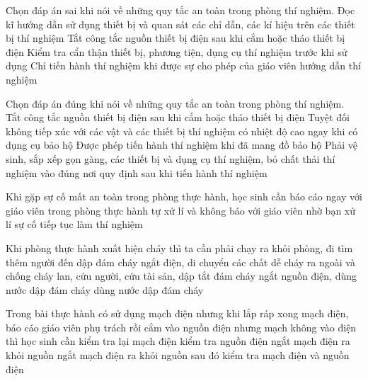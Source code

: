 \begin{ex}
	Chọn đáp án sai khi nói về những quy tắc an toàn trong phòng thí nghiệm.
	\choice
	{Đọc kĩ hướng dẫn sử dụng thiết bị và quan sát các chỉ dẫn, các kí hiệu trên các thiết bị thí nghiệm}
	{\True Tắt công tắc nguồn thiết bị điện sau khi cắm hoặc tháo thiết bị điện}
	{Kiểm tra cẩn thận thiết bị, phương tiện, dụng cụ thí nghiệm trước khi sử dụng}
	{Chỉ tiến hành thí nghiệm khi được sự cho phép của giáo viên hướng dẫn thí nghiệm}
	\loigiai{}
\end{ex}

\begin{ex}
	Chọn đáp án đúng khi nói về những quy tắc an toàn trong phòng thí nghiệm.
	\choice
	{Tắt công tắc nguồn thiết bị điện sau khi cắm hoặc tháo thiết bị điện}
	{Tuyệt đối không tiếp xúc với các vật và các thiết bị thí nghiệm có nhiệt độ cao ngay khi có dụng cụ bảo hộ}
	{Được phép tiến hành thí nghiệm khi đã mang đồ bảo hộ}
	{\True Phải vệ sinh, sắp xếp gọn gàng, các thiết bị và dụng cụ thí nghiệm, bỏ chất thải thí nghiệm vào đúng nơi quy định sau khi tiến hành thí nghiệm}
	\loigiai{}
\end{ex}

\begin{ex}
	Khi gặp sự cố mất an toàn trong phòng thực hành, học sinh cần
	\choice
	{\True báo cáo ngay với giáo viên trong phòng thực hành}
	{tự xử lí và không báo với giáo viên}
	{nhờ bạn xử lí sự cố}
	{tiếp tục làm thí nghiệm}
	\loigiai{}
\end{ex}

\begin{ex}
	Khi phòng thực hành xuất hiện cháy thì ta cần phải
	\choice
	{chạy ra khỏi phòng, đi tìm thêm người đến dập đám cháy}
	{\True ngắt điện, di chuyển các chất dễ cháy ra ngoài và chống cháy lan, cứu người, cứu tài sản, dập tắt đám cháy}
	{ngắt nguồn điện, dùng nước dập đám cháy}
	{dùng nước dập đám cháy}
	\loigiai{}
\end{ex}

\begin{ex}
	Trong bài thực hành có sử dụng mạch điện nhưng khi lắp ráp xong mạch điện, báo cáo giáo viên phụ trách rồi cắm vào nguồn điện nhưng mạch không vào điện thì học sinh cần
	\choice
	{kiểm tra lại mạch điện}
	{kiểm tra nguồn điện}
	{ngắt mạch điện ra khỏi nguồn}
	{\True ngắt mạch điện ra khỏi nguồn sau đó kiểm tra mạch điện và nguồn điện}
	\loigiai{}
\end{ex}

